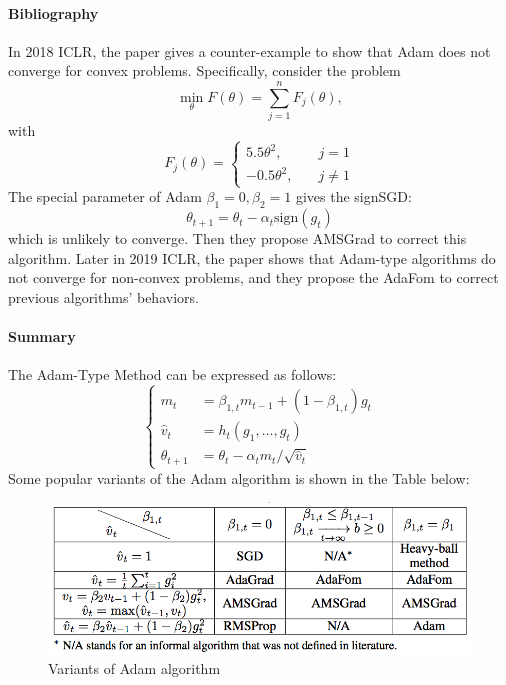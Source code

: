 \paragraph{Bibliography}
In 2018 ICLR, the paper \citep{2018on} gives a counter-example to show that Adam does not converge for convex problems.
Specifically, consider the problem
\[
\min_{\theta}F(\theta)=\sum_{j=1}^nF_j(\theta),
\]
with 
\[
F_j(\theta) = \left\{
\begin{aligned}
5.5\theta^2,&\quad j=1\\
-0.5\theta^2,&\quad j\ne1
\end{aligned}
\right.
\]
The special parameter of Adam $\beta_1=0,\beta_2=1$ gives the signSGD:
\[
\theta_{t+1} = \theta_t - \alpha_t \text{sign}(g_t)
\]
which is unlikely to converge.
Then they propose AMSGrad to correct this algorithm.
Later in 2019 ICLR, the paper \citep{chen2018on} shows that Adam-type algorithms do not converge for non-convex problems, and they propose the AdaFom to correct previous algorithms' behaviors.

\paragraph{Summary}
The Adam-Type Method can be expressed as follows:
\[
\left\{
\begin{aligned}
m_t &= \beta_{1,t} m_{t-1} + (1-\beta_{1,t})g_t\\
\hat{v}_t &= h_t(g_1,\dots,g_t)\\
\theta_{t+1} &= \theta_t - \alpha_tm_t/\sqrt{\hat{v}_t }
\end{aligned}
\right.
\]
Some popular variants of the Adam algorithm is shown in the Table below:
\begin{figure}[H]
\centering
\includegraphics[width=\textwidth]{Nineth_lecture/p_6}
\caption{Variants of Adam algorithm}
\end{figure}




